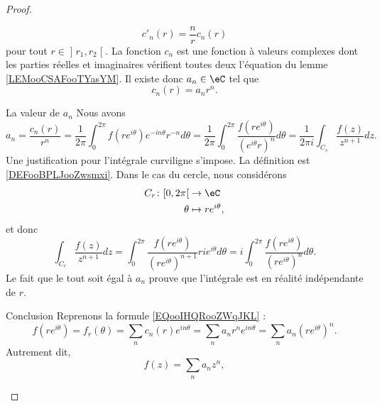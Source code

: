 \begin{proof}
\begin{subproof}
\begin{equation}
            c'_n(r)=\frac{ n }{ r }c_n(r)
        \end{equation}
    pour tout \( r\in \mathopen] r_1 , r_2 \mathclose[\). La fonction \( c_n\) est une fonction à valeurs complexes dont les parties réelles et imaginaires vérifient toutes deux l'équation du lemme \ref{LEMooCSAFooTYasYM}. Il existe donc \( a_n\in \eC\) tel que
        \begin{equation}
            c_n(r)=a_nr^n.
        \end{equation}
    \item[La valeur de \( a_n\)]
        Nous avons
        \begin{equation}        \label{EQooFNUHooZbbNAT}
                a_n=\frac{ c_n(r) }{ r^n }=\frac{1}{ 2\pi }\int_0^{2\pi}f(r e^{i\theta}) e^{-in\theta}r^{-n}d\theta
                =\frac{1}{ 2\pi }\int_0^{2\pi}\frac{ f(r e^{i\theta}) }{ ( e^{i\theta}r)^n }d\theta
                =\frac{1}{ 2\pi i }\int_{C_s}\frac{ f(z) }{ z^{n+1} }dz.
        \end{equation}
        Une justification pour l'intégrale curviligne s'impose. La définition est \ref{DEFooBPLJooZwsmxi}. Dans le cas du cercle, nous considérons
        \begin{equation}
            \begin{aligned}
                C_r\colon \mathopen[ 0 , 2\pi \mathclose[&\to \eC \\
                    \theta&\mapsto r e^{i\theta}, 
            \end{aligned}
        \end{equation}
        et donc
        \begin{equation}
            \int_{C_r}\frac{ f(z) }{ z^{n+1} }dz=\int_0^{2\pi}\frac{ f(r e^{i\theta}) }{ (r e^{i\theta})^{n+1} }ri e^{i\theta}d\theta=i\int_0^{2\pi}\frac{ f(r e^{i\theta}) }{ (r e^{i\theta})^n }d\theta.
        \end{equation}
        Le fait que le tout soit égal à \( a_n\) prouve que l'intégrale est en réalité indépendante de \( r\).
    \item[Conclusion]
        Reprenons la formule \eqref{EQooIHQRooZWqJKL} :
        \begin{equation}
            f(r e^{i\theta})=f_r(\theta)=\sum_nc_n(r) e^{in\theta}=\sum_na_nr^n e^{in\theta}=\sum_na_n(r e^{i\theta})^n.
        \end{equation}
        Autrement dit,
        \begin{equation}
            f(z)=\sum_na_nz^n,

\end{equation}
\end{subproof}
\end{proof}
